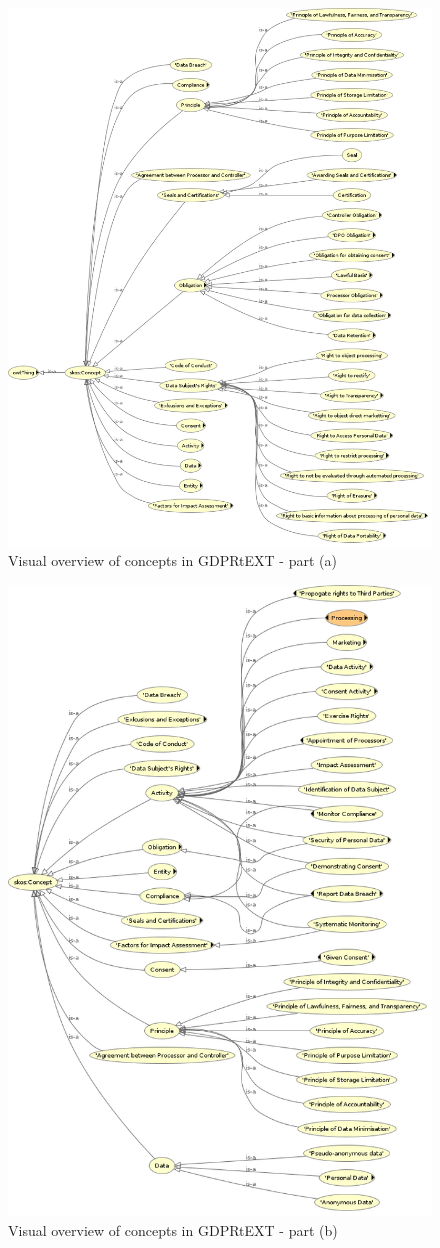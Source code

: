 \begin{figure}[htbp]
    \centering
    \includegraphics[width=0.75\linewidth]{img/gdprtext-summary-a}
    \caption{Visual overview of concepts in GDPRtEXT - part (a) \cite{}}
    \label{fig:vocab:gdprtext-summary-a}
\end{figure}
\begin{figure}[htbp]
    \centering
    \includegraphics[width=0.75\linewidth]{img/gdprtext-summary-b}
    \caption{Visual overview of concepts in GDPRtEXT - part (b) \cite{}}
    \label{fig:vocab:gdprtext-summary-b}
\end{figure}

